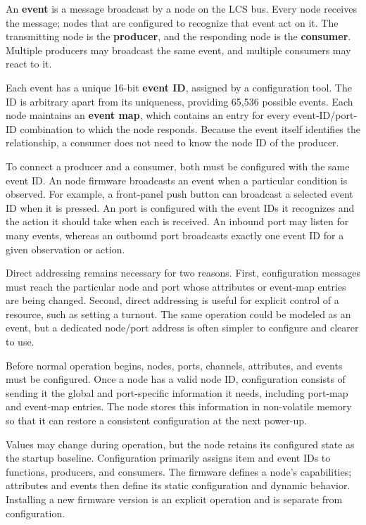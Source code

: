An \textbf{event} is a message broadcast by a node on the LCS bus. Every node receives the message; nodes that are configured to recognize that event act on it. The transmitting node is the \textbf{producer}, and the responding node is the \textbf{consumer}. Multiple producers may broadcast the same event, and multiple consumers may react to it.

Each event has a unique 16-bit \textbf{event ID}, assigned by a configuration tool. The ID is arbitrary apart from its uniqueness, providing 65,536 possible events. Each node maintains an \textbf{event map}, which contains an entry for every event-ID/port-ID combination to which the node responds. Because the event itself identifies the relationship, a consumer does not need to know the node ID of the producer.

To connect a producer and a consumer, both must be configured with the same event ID. An node firmware broadcasts an event when a particular condition is observed. For example, a front-panel push button can broadcast a selected event ID when it is pressed. An port is configured with the event IDs it recognizes and the action it should take when each is received. An inbound port may listen for many events, whereas an outbound port broadcasts exactly one event ID for a given observation or action.

Direct addressing remains necessary for two reasons. First, configuration messages must reach the particular node and port whose attributes or event-map entries are being changed. Second, direct addressing is useful for explicit control of a resource, such as setting a turnout. The same operation could be modeled as an event, but a dedicated node/port address is often simpler to configure and clearer to use.



Before normal operation begins, nodes, ports, channels, attributes, and events must be configured. Once a node has a valid node ID, configuration consists of sending it the global and port-specific information it needs, including port-map and event-map entries. The node stores this information in non-volatile memory so that it can restore a consistent configuration at the next power-up.

Values may change during operation, but the node retains its configured state as the startup baseline. Configuration primarily assigns item and event IDs to functions, producers, and consumers. The firmware defines a node's capabilities; attributes and events then define its static configuration and dynamic behavior. Installing a new firmware version is an explicit operation and is separate from configuration.


